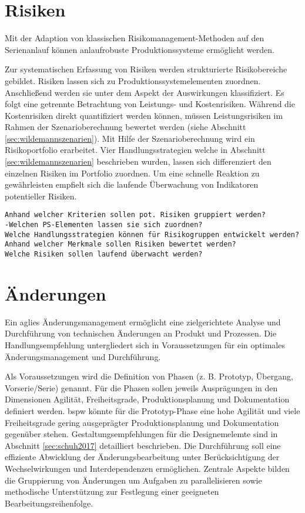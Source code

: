 \section{Risiken}

Mit der Adaption von klassischen Risikomanagement-Methoden auf den Serienanlauf können anlaufrobuste Produktionssysteme ermöglicht werden. 

Zur systematischen Erfassung von Risiken werden strukturierte Risikobereiche gebildet. Risiken lassen sich zu Produktionssystemelementen zuordnen. Anschließend werden sie unter dem Aspekt der Auswirkungen klassifiziert. Es folgt eine getrennte Betrachtung von Leistungs- und Kostenrisiken. 
Während die Kostenrisiken direkt quantifiziert werden können, müssen Leistungsrisiken im Rahmen der Szenarioberechnung bewertet werden (siehe Abschnitt \ref{sec:wildemannszenarien}).
Mit Hilfe der Szenarioberechnung wird ein Risikoportfolio erarbeitet. Vier Handlungsstrategien welche in Abschnitt  \ref{sec:wildemannszenarien} beschrieben wurden, lassen sich differenziert den einzelnen Risiken im Portfolio zuordnen.
Um eine schnelle Reaktion zu gewährleisten empfielt sich die laufende Überwachung von Indikatoren potentieller Risiken. 

\begin{verbatim}
Anhand welcher Kriterien sollen pot. Risiken gruppiert werden?
-Welchen PS-Elementen lassen sie sich zuordnen? 
Welche Handlungsstrategien können für Risikogruppen entwickelt werden?
Anhand welcher Merkmale sollen Risiken bewertet werden?
Welche Risiken sollen laufend überwacht werden?
\end{verbatim}

\section{Änderungen}

Ein aglies Änderungsmanagement ermöglicht eine zielgerichtete Analyse und Durchführung von technischen Änderungen an Produkt und Prozessen. Die Handlungsempfehlung untergliedert sich in Voraussetzungen für ein optimales Änderungsmanagement und  Durchführung. %

Als Voraussetzungen wird die Definition von Phasen (z. B. Prototyp, Übergang, Vorserie/Serie) genannt. Für die Phasen sollen jeweils Ausprägungen in den Dimensionen Agilität, Freiheitsgrade, Produktionsplanung und Dokumentation definiert werden. \Gls{bspw} könnte für die Prototyp-Phase eine hohe Agilität und viele Freiheitsgrade gering ausgeprägter Produktionsplanung und Dokumentation gegenüber stehen. Gestaltungsempfehlungen für die Designemelemte sind in Abschnitt \ref{sec:schuh2017} detailliert beschrieben. 
Die Durchführung soll eine effiziente Abwicklung der Änderungsbearbeitung unter Berücksichtigung der Wechselwirkungen und Interdependenzen ermöglichen. Zentrale Aspekte bilden die Gruppierung von Änderungen um Aufgaben zu parallelisieren sowie methodische Unterstützung zur Festlegung einer geeigneten Bearbeitungsreihenfolge. 

